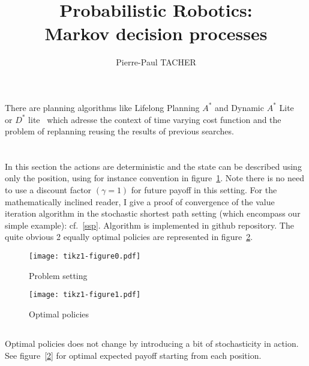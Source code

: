 \documentclass[11pt, fleqn]{amsart}
\title{%
		Probabilistic Robotics: \\
		Markov decision processes}
\theoremstyle{definition}
\theoremstyle{definition}
\theoremstyle{definition}
\theoremstyle{definition}
\theoremstyle{remark}
\begin{document}
\maketitle
\author{Pierre-Paul TACHER}

\setcounter{section}{1}
\section{} There are planning algorithms like Lifelong Planning $A^{*}$ and Dynamic $A^{*}$ Lite ~\cite{likhachev1} or $D^{*}$ lite~\cite{likhachev2} which adresse the context of time varying cost function and the problem of replanning reusing the results of previous searches.

\section{}
\subsection{} In this section the actions are deterministic and the state can be described using only the position, using for instance convention in figure~\ref{0}. Note there is no need to use a discount factor $(\gamma=1)$ for future payoff in this setting.  For the mathematically inclined reader, I give a proof of convergence of the value iteration algorithm in the stochastic shortest path setting (which encompass our simple example): cf.~\ref{ssp}. Algorithm is implemented in github repository. The quite obvious 2 equally optimal policies are represented in figure~\ref{1}.
\begin{figure}
\texttt{[image: tikz1-figure0.pdf]}
\caption{Problem setting}
\label{0}
\end{figure}
\begin{figure}
\texttt{[image: tikz1-figure1.pdf]}
\caption{Optimal policies}
\label{1}
\end{figure}
\subsection{} Optimal policies does not change by introducing a bit of stochasticity in action. See figure~\ref{2} for optimal expected payoff starting from each position.
\end{document}

